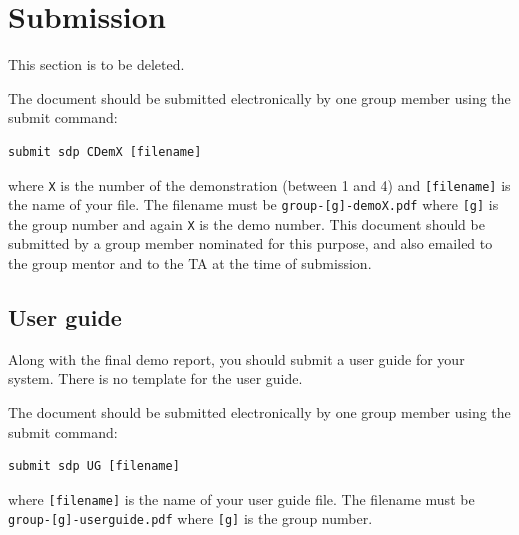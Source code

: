 \documentclass{article}
\begin{document}
\section*{Submission}
This section is to be deleted.

The document should be submitted electronically by one group member using the submit command: 
\begin{verbatim}
submit sdp CDemX [filename] 
\end{verbatim}

where \verb|X| is the number of the demonstration (between 1 and 4) and \verb|[filename]| is the name of your file. The filename must be  \verb|group-[g]-demoX.pdf| where \verb|[g]| is the group number and again  \verb|X| is the demo number.
This document should be submitted by a group member nominated for this purpose, and also emailed to the group mentor and to the TA at the time of submission.


\subsection*{User guide}
Along with the final demo report, you should submit a user guide for your system. There is no template for the user guide.

The document should be submitted electronically by one group member using the submit command: 
\begin{verbatim}
submit sdp UG [filename] 
\end{verbatim}

where \verb|[filename]| is the name of your user guide file. The filename must be  \verb|group-[g]-userguide.pdf| where \verb|[g]| is the group number.




\end{document}
